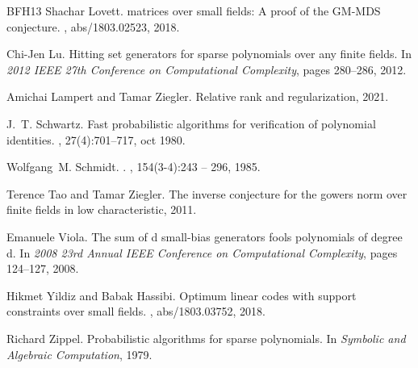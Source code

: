 \documentclass[10pt,a4paper]{article}
\begin{document}
\begin{thebibliography}{BFH{\etalchar{+}}13}
Shachar Lovett.
 matrices over small fields: {A} proof of the {GM-MDS}
  conjecture.
, abs/1803.02523, 2018.

Chi-Jen Lu.
\newblock Hitting set generators for sparse polynomials over any finite fields.
\newblock In {\em 2012 IEEE 27th Conference on Computational Complexity}, pages
  280--286, 2012.

Amichai Lampert and Tamar Ziegler.
\newblock Relative rank and regularization, 2021.

J.~T. Schwartz.
\newblock Fast probabilistic algorithms for verification of polynomial
  identities.
, 27(4):701–717, oct 1980.

Wolfgang~M. Schmidt.
.
, 154(3-4):243 -- 296, 1985.

Terence Tao and Tamar Ziegler.
\newblock The inverse conjecture for the gowers norm over finite fields in low
  characteristic, 2011.

Emanuele Viola.
\newblock The sum of d small-bias generators fools polynomials of degree d.
\newblock In {\em 2008 23rd Annual IEEE Conference on Computational
  Complexity}, pages 124--127, 2008.

Hikmet Yildiz and Babak Hassibi.
\newblock Optimum linear codes with support constraints over small fields.
, abs/1803.03752, 2018.

Richard Zippel.
\newblock Probabilistic algorithms for sparse polynomials.
\newblock In {\em Symbolic and Algebraic Computation}, 1979.

\end{thebibliography}
\end{document}
